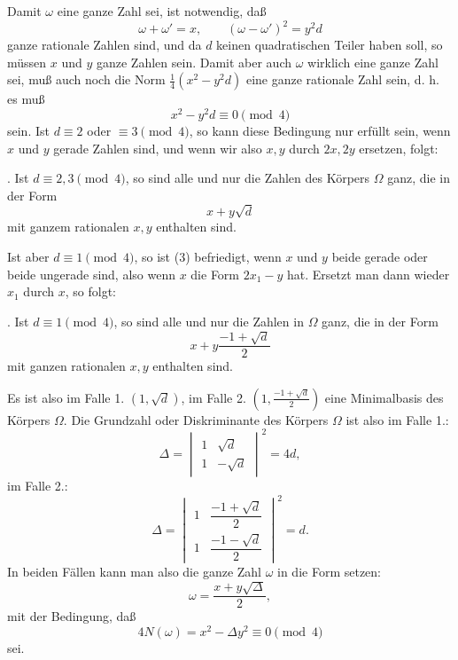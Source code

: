 \documentclass[11pt]{article}
\begin{document}
Damit $\omega$ eine ganze Zahl sei, ist notwendig, daß
\[
 \omega+\omega'=x,
 \qquad (\omega-\omega')^2=y^2d
\]
ganze rationale Zahlen sind, und da $d$ keinen quadratischen Teiler haben soll, so müssen $x$ und $y$ ganze Zahlen sein. Damit aber auch $\omega$ wirklich eine ganze Zahl sei, muß auch noch die Norm $\frac14(x^2-y^2d)$ eine ganze rationale Zahl sein, d. h. es muß
\begin{equation}
 x^2-y^2d\equiv 0\pmod 4
\tag{4}
\end{equation}
sein. Ist $d\equiv2$ oder $\equiv3\pmod4$, so kann diese Bedingung nur erfüllt sein, wenn $x$ und $y$ gerade Zahlen sind, und wenn wir also $x,y$ durch $2x,2y$ ersetzen, folgt:

\medskip
{}. Ist $d\equiv2,3\pmod4$, so sind alle und nur die Zahlen des Körpers $\Omega$ ganz, die in der Form
\[
 x+y\sqrt d
\]
mit ganzem rationalen $x,y$ enthalten sind.
\medskip

Ist aber $d\equiv1\pmod4$, so ist (3) befriedigt, wenn $x$ und $y$ beide gerade oder beide ungerade sind, also wenn $x$ die Form $2x_1-y$ hat. Ersetzt man dann wieder $x_1$ durch $x$, so folgt:

\medskip
{}. Ist $d\equiv1\pmod4$, so sind alle und nur die Zahlen in $\Omega$ ganz, die in der Form
\[
 x+y\frac{-1+\sqrt d}{2}
\]
mit ganzen rationalen $x,y$ enthalten sind.
\medskip

Es ist also im Falle 1. $(1,\sqrt d)$, im Falle 2. $\left(1,\frac{-1+\sqrt d}{2}\right)$ eine Minimalbasis des Körpers $\Omega$. Die Grundzahl oder Diskriminante des Körpers $\Omega$ ist also im Falle 1.:
\begin{equation}
 \Delta=\begin{vmatrix}
 1&\sqrt d\\
 1&-\sqrt d
 \end{vmatrix}^{2}=4d,
\tag{5}
\end{equation}
im Falle 2.:
\begin{equation}
 \Delta=\begin{vmatrix}
 1&\dfrac{-1+\sqrt d}{2}\\[0.35em]
 1&\dfrac{-1-\sqrt d}{2}
 \end{vmatrix}^{2}=d.
\tag{6}
\end{equation}
In beiden Fällen kann man also die ganze Zahl $\omega$ in die Form setzen:
\begin{equation}
 \omega=\frac{x+y\sqrt\Delta}{2},
\tag{7}
\end{equation}
mit der Bedingung, daß
\begin{equation}
 4N(\omega)=x^2-\Delta y^2\equiv0\pmod4
\tag{8}
\end{equation}
sei.
\end{document}
